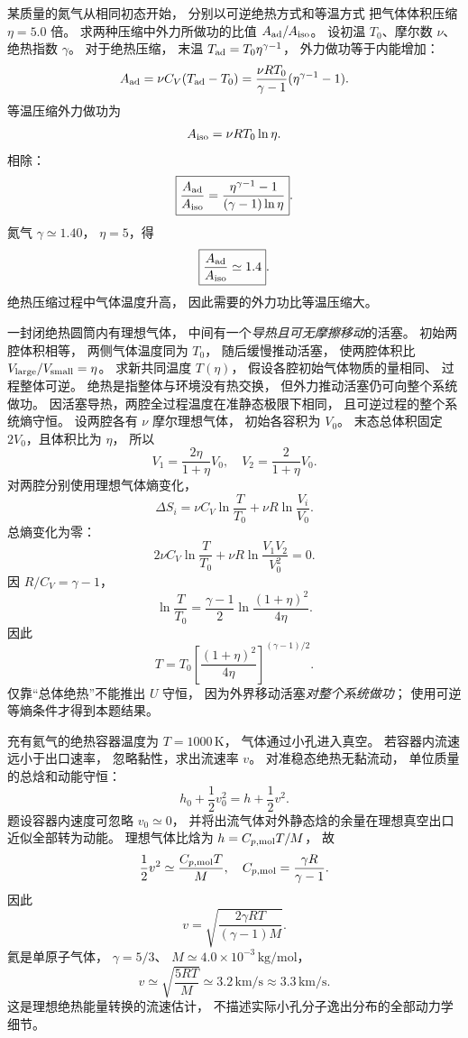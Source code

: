 某质量的氮气从相同初态开始，
分别以可逆绝热方式和等温方式
把气体体积压缩 $\eta=5.0$ 倍。
求两种压缩中外力所做功的比值
$A_{\rm ad}/A_{\rm iso}$。
\exsolution
设初温 $T_0$、摩尔数 $\nu$、
绝热指数 $\gamma$。
对于绝热压缩，
末温
$T_{\rm ad}=T_0\eta^{\gamma-1}$，
外力做功等于内能增加：
\[
A_{\rm ad}=
\nu C_V(T_{\rm ad}-T_0)
=\frac{\nu RT_0}{\gamma-1}
(\eta^{\gamma-1}-1).
\]
等温压缩外力做功为
\[
A_{\rm iso}=\nu RT_0\ln\eta.
\]
相除：
\[
\boxed{\frac{A_{\rm ad}}{A_{\rm iso}}
=\frac{\eta^{\gamma-1}-1}
{(\gamma-1)\ln\eta}}.
\]
氮气 $\gamma\simeq1.40$，
$\eta=5$，得
\[
\boxed{\frac{A_{\rm ad}}{A_{\rm iso}}
\simeq1.4}.
\]
\excheck 绝热压缩过程中气体温度升高，
因此需要的外力功比等温压缩大。

一封闭绝热圆筒内有理想气体，
中间有一个\emph{导热且可无摩擦移动}的活塞。
初始两腔体积相等，
两侧气体温度同为 $T_0$，
随后缓慢推动活塞，
使两腔体积比
$V_{\rm large}/V_{\rm small}=\eta$。
求新共同温度 $T(\eta)$，
假设各腔初始气体物质的量相同、
过程整体可逆。
\exsolution
绝热是指整体与环境没有热交换，
但外力推动活塞仍可向整个系统做功。
因活塞导热，两腔全过程温度在准静态极限下相同，
且可逆过程的整个系统熵守恒。
设两腔各有 $\nu$ 摩尔理想气体，
初始各容积为 $V_0$。
末态总体积固定 $2V_0$，且体积比为 $\eta$，
所以
\[
V_1=\frac{2\eta}{1+\eta}V_0,\quad
V_2=\frac2{1+\eta}V_0.
\]
对两腔分别使用理想气体熵变化，
\[
\Delta S_i=\nu C_V\ln\frac T{T_0}
+\nu R\ln\frac{V_i}{V_0}.
\]
总熵变化为零：
\[
2\nu C_V\ln\frac T{T_0}
+\nu R\ln\frac{V_1V_2}{V_0^2}=0.
\]
因 $R/C_V=\gamma-1$，
\[
\ln\frac T{T_0}
=\frac{\gamma-1}{2}
\ln\frac{(1+\eta)^2}{4\eta}.
\]
因此
\[
\boxed{T=T_0
\left[\frac{(1+\eta)^2}{4\eta}\right]^{(\gamma-1)/2}}.
\]
\excheck 仅靠“总体绝热”不能推出 $U$ 守恒，
因为外界移动活塞\emph{对整个系统做功}；
使用可逆等熵条件才得到本题结果。

充有氦气的绝热容器温度为
$T=1000\,\mathrm K$，
气体通过小孔进入真空。
若容器内流速远小于出口速率，
忽略黏性，求出流速率 $v$。
\exsolution
对准稳态绝热无黏流动，
单位质量的总焓和动能守恒：
\[
h_0+\frac12v_0^2=h+\frac12v^2.
\]
题设容器内速度可忽略 $v_0\simeq0$，
并将出流气体对外静态焓的余量在理想真空出口
近似全部转为动能。
理想气体比焓为
$h=C_{p,\rm mol}T/M$，
故
\[
\frac12v^2\simeq\frac{C_{p,\rm mol}T}{M},
\quad
C_{p,\rm mol}=\frac{\gamma R}{\gamma-1}.
\]
因此
\[
\boxed{v=\sqrt{
\frac{2\gamma RT}{(\gamma-1)M}}}.
\]
氦是单原子气体，
$\gamma=5/3$、
$M\simeq4.0\times10^{-3}\,\mathrm{kg/mol}$，
\[
\boxed{v\simeq\sqrt{\frac{5RT}{M}}
\simeq3.2\,\mathrm{km/s}\approx3.3\,\mathrm{km/s}}.
\]
\excheck 这是理想绝热能量转换的流速估计，
不描述实际小孔分子逸出分布的全部动力学细节。

